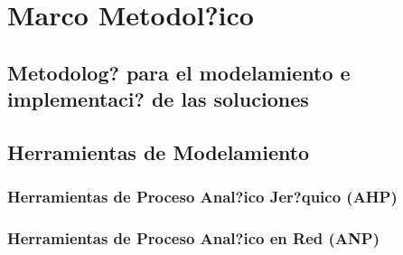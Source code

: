 \chapter{Marco Metodol?ico}
\label{ch:herram}

\section{Metodolog? para el modelamiento e implementaci? de las soluciones}

\section{Herramientas de Modelamiento}
\subsection{Herramientas de Proceso Anal?ico Jer?quico (AHP)}
\subsection{Herramientas de Proceso Anal?ico en Red (ANP)}